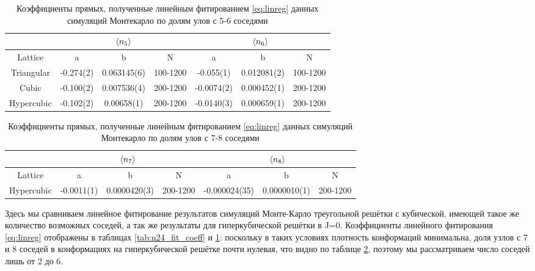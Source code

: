 \begin{table}[]
    \centering
    \begin{tabular}{|c|c|c|c|c|c|c|} \hline
         & \multicolumn{3}{|c|}{$\langle n_{5} \rangle$} & \multicolumn{3}{|c|}{$\langle n_{6} \rangle$}  \\ \hline
        Lattice & a & b & N & a & b & N \\ \hline 
        Triangular & -0.274(2) & 0.063145(6) & 100-1200 & -0.055(1) & 0.012081(2) & 100-1200\\ \hline
        Cubic & -0.100(2) & 0.007536(4) & 200-1200 & -0.0074(2) & 0.000452(1) & 200-1200 \\ \hline
        Hypercubic & -0.102(2) & 0.00658(1) & 200-1200 & -0.0140(3) & 0.000659(1) & 200-1200\\ \hline
    \end{tabular}
    \caption{Коэффициенты прямых, полученные линейным фитированием \eqref{eq:linreg} данных симуляций Монтекарло по долям улов с 5-6 соседями}
    \label{tab:n56_fit_coeff}
\end{table}

\begin{table}[]
    \centering
    \begin{tabular}{|c|c|c|c|c|c|c|} \hline
         & \multicolumn{3}{|c|}{$\langle n_{7} \rangle$} & \multicolumn{3}{|c|}{$\langle n_{8} \rangle$}  \\ \hline
        Lattice & a & b & N & a & b & N \\ \hline 
        Hypercubic & -0.0011(1) & 0.0000420(3) & 200-1200 & -0.000024(35) & 0.0000010(1) & 200-1200\\ \hline
    \end{tabular}
    \caption{Коэффициенты прямых, полученные линейным фитированием \eqref{eq:linreg} данных симуляций Монтекарло по долям улов с 7-8 соседями}
    \label{tab:n78_fit_coeff}
\end{table}

Здесь мы сравниваем линейное фитирование результатов симуляций Монте-Карло треугольной решётки с кубической, имеющей такое же количество возможных соседей, а так же результаты для гиперкубической решётки в J=0. Коэффициенты линейного фитирования \eqref{eq:linreg} отображены в таблицах \ref{tab:n24_fit_coeff} и \ref{tab:n56_fit_coeff}: поскольку в таких условиях плотность конформаций минимальна, доля узлов с 7 и 8 соседей в конформациях на гиперкубической решётке почти нулевая, что видно по таблице \ref{tab:n78_fit_coeff}, поэтому мы рассматриваем число соседей лишь от 2 до 6. 

